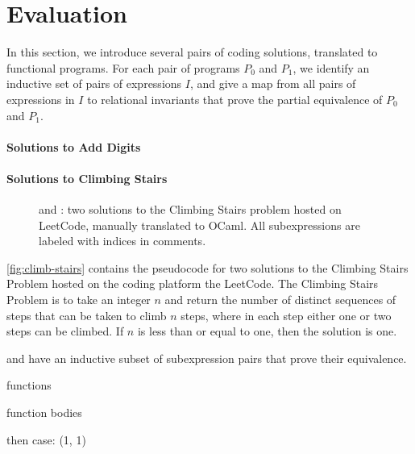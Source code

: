 \section{Evaluation}
\label{sec:evaluation}
%
In this section, we introduce several pairs of coding solutions,
translated to functional programs.
%
For each pair of programs $P_0$ and $P_1$, we identify an inductive
set of pairs of expressions $I$, and give a map from all pairs of
expressions in $I$ to relational invariants that prove the partial
equivalence of $P_0$ and $P_1$.

\paragraph{Solutions to Add Digits}
%

\paragraph{Solutions to Climbing Stairs}
%
\begin{figure}[t]
  \begin{minipage}{0.45\linewidth}
    
  \end{minipage}
  \begin{minipage}{0.45\linewidth}
        
  \end{minipage}
  \caption{ and : two solutions to
    the Climbing Stairs problem hosted on LeetCode, manually translated
    to OCaml.
    All subexpressions are labeled with indices in comments.
  }
  \label{fig:climb-stairs}
\end{figure}
%
\autoref{fig:climb-stairs} contains the pseudocode for two solutions
to the Climbing Stairs Problem hosted on the coding platform the
LeetCode.
The Climbing Stairs Problem is to take an integer $n$ and return the
number of distinct sequences of steps that can be taken to climb $n$
steps, where in each step either one or two steps can be climbed. If
$n$ is less than or equal to one, then the solution is one.
%

%
 and  have an inductive subset of
subexpression pairs that prove their equivalence.
%

%
functions

function bodies

then case: (1, 1)

